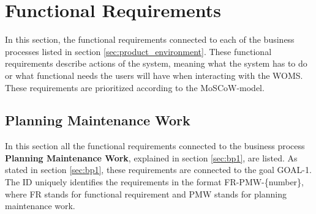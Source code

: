 \section{Functional Requirements}
\label{sec:functional_requirements}

In this section, the functional requirements connected to each of the business processes listed in section \ref{sec:product_environment}. These functional requirements describe actions of the system, meaning what the system has to do or what functional needs the users will have when interacting with the WOMS. These requirements are prioritized according to the MoSCoW-model. 

\subsection{Planning Maintenance Work}
\label{sub:planning_maintenance_work}
In this section all the functional requirements connected to the business process \textbf{Planning Maintenance Work}, explained in section \ref{sec:bp1}, are listed. As stated in section \ref{sec:bp1}, these requirements are connected to the goal GOAL-1. The ID uniquely identifies the requirements in the format FR-PMW-\{number\}, where  FR stands for functional requirement and PMW stands for planning maintenance work. 



